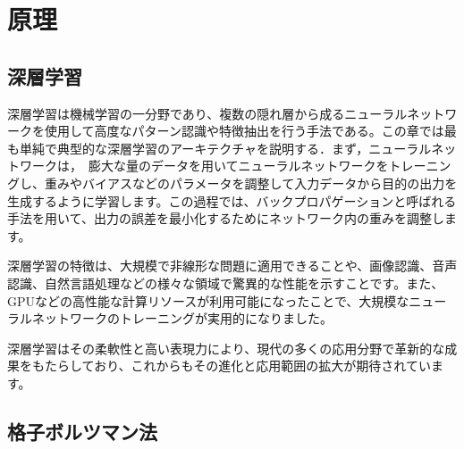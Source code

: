 \chapter{原理 \label{chap:principles}}
\section{深層学習 \label{section:deep-learning}}
深層学習は機械学習の一分野であり、複数の隠れ層から成るニューラルネットワークを使用して高度なパターン認識や特徴抽出を行う手法である。この章では最も単純で典型的な深層学習のアーキテクチャを説明する．まず，ニューラルネットワークは，　膨大な量のデータを用いてニューラルネットワークをトレーニングし、重みやバイアスなどのパラメータを調整して入力データから目的の出力を生成するように学習します。この過程では、バックプロパゲーションと呼ばれる手法を用いて、出力の誤差を最小化するためにネットワーク内の重みを調整します。

深層学習の特徴は、大規模で非線形な問題に適用できることや、画像認識、音声認識、自然言語処理などの様々な領域で驚異的な性能を示すことです。また、GPUなどの高性能な計算リソースが利用可能になったことで、大規模なニューラルネットワークのトレーニングが実用的になりました。

深層学習はその柔軟性と高い表現力により、現代の多くの応用分野で革新的な成果をもたらしており、これからもその進化と応用範囲の拡大が期待されています。

\section{格子ボルツマン法 \label{section:lbm}}